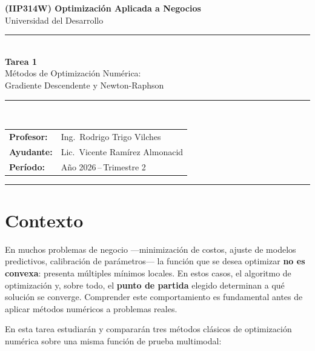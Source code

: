 \documentclass[12pt,a4paper]{article}
\begin{document}

\begin{center}
    {\Large\bfseries\color{uddblue}
     (IIP314W) Optimización Aplicada a Negocios}\\[0.4em]
    {\large Universidad del Desarrollo}\\[0.8em]
    \noindent\rule{\linewidth}{1.5pt}\\[0.5em]
    {\LARGE\bfseries Tarea 1}\\[0.3em]
    {\large Métodos de Optimización Numérica:\\
     Gradiente Descendente y Newton-Raphson}\\[0.5em]
    \noindent\rule{\linewidth}{1.5pt}\\[0.8em]
    \begin{tabular}{@{}ll@{}}
        \textbf{Profesor:} & Ing.\ Rodrigo Trigo Vilches \\[0.3em]
        \textbf{Ayudante:} & Lic.\ Vicente Ramírez Almonacid \\[0.3em]
        \textbf{Período:}  & Año 2026\,--\,Trimestre 2
    \end{tabular}
\end{center}

\vspace{1em}
\noindent\rule{\linewidth}{0.4pt}
\vspace{0.5em}

\section*{Contexto}

En muchos problemas de negocio —minimización de costos, ajuste de modelos
predictivos, calibración de parámetros— la función que se desea optimizar
\textbf{no es convexa}: presenta múltiples mínimos locales. En estos casos, el
algoritmo de optimización y, sobre todo, el \textbf{punto de partida} elegido
determinan a qué solución se converge. Comprender este comportamiento es
fundamental antes de aplicar métodos numéricos a problemas reales.

En esta tarea estudiarán y compararán tres métodos clásicos de optimización
numérica sobre una misma función de prueba multimodal:
\end{document}
